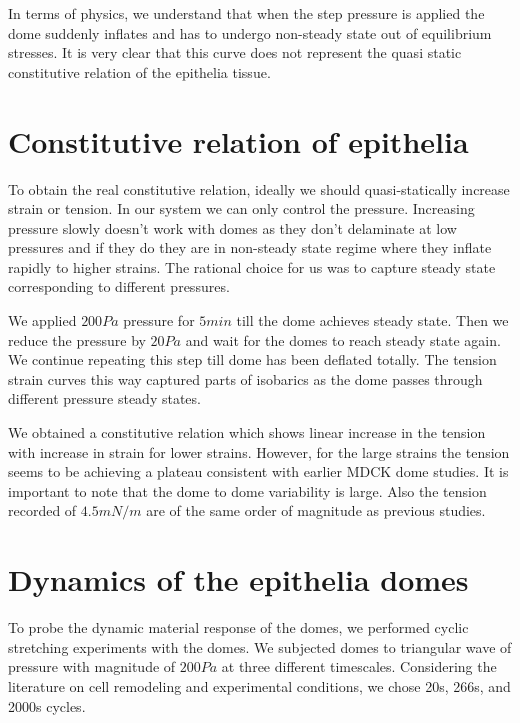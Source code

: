 In terms of physics, we understand that when the step pressure is
applied the dome suddenly inflates and has to undergo non-steady state
out of equilibrium stresses. It is very clear that this curve does not
represent the quasi static constitutive relation of the epithelia
tissue.

\hypertarget{constitutive-relation-of-epithelia}{%
\section{Constitutive relation of
epithelia}\label{constitutive-relation-of-epithelia}}

To obtain the real constitutive relation, ideally we should
quasi-statically increase strain or tension. In our system we can only
control the pressure. Increasing pressure slowly doesn't work with domes
as they don't delaminate at low pressures and if they do they are in
non-steady state regime where they inflate rapidly to higher strains.
The rational choice for us was to capture steady state corresponding to
different pressures.

We applied \(200 Pa\) pressure for \(5min\) till the dome achieves
steady state. Then we reduce the pressure by \(20Pa\) and wait for the
domes to reach steady state again. We continue repeating this step till
dome has been deflated totally. The tension strain curves this way
captured parts of isobarics as the dome passes through different
pressure steady states.

We obtained a constitutive relation which shows linear increase in the
tension with increase in strain for lower strains. However, for the
large strains the tension seems to be achieving a plateau consistent
with earlier MDCK dome studies. It is important to note that the dome to
dome variability is large. Also the tension recorded of \(4.5mN/m\) are
of the same order of magnitude as previous studies.

\hypertarget{dynamics-of-the-epithelia-domes}{%
\section{Dynamics of the epithelia
domes}\label{dynamics-of-the-epithelia-domes}}

To probe the dynamic material response of the domes, we performed cyclic
stretching experiments with the domes. We subjected domes to triangular
wave of pressure with magnitude of \(200Pa\) at three different
timescales. Considering the literature on cell remodeling and
experimental conditions, we chose 20s, 266s, and 2000s cycles.


